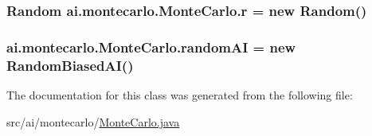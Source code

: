 \label{classai_1_1montecarlo_1_1_monte_carlo_a43072c462191f467fc3e28034398558e}
\hypertarget{classai_1_1montecarlo_1_1_monte_carlo_afe972f6e13fe999090cadd591be22419}{
\subsubsection[{r}]{\setlength{\rightskip}{0pt plus 5cm}Random {\bf ai.montecarlo.MonteCarlo.r} = new Random()}}
\label{classai_1_1montecarlo_1_1_monte_carlo_afe972f6e13fe999090cadd591be22419}
\hypertarget{classai_1_1montecarlo_1_1_monte_carlo_a787e4ffe12e97749660eaa73bffcc17b}{
\subsubsection[{randomAI}]{ {\bf ai.montecarlo.MonteCarlo.randomAI} = new {\bf RandomBiasedAI}()}}
\label{classai_1_1montecarlo_1_1_monte_carlo_a787e4ffe12e97749660eaa73bffcc17b}


The documentation for this class was generated from the following file:\begin{DoxyCompactItemize}
\item 
src/ai/montecarlo/\hyperlink{_monte_carlo_8java}{MonteCarlo.java}\end{DoxyCompactItemize}
